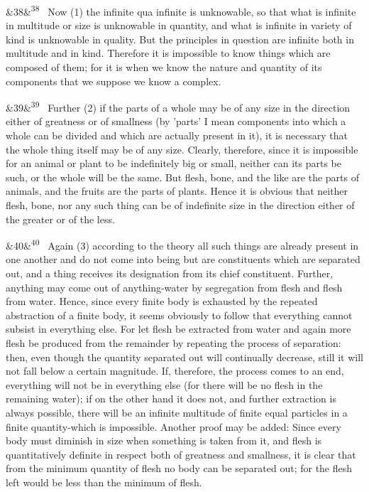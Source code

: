 \documentclass[12pt]{article}
\newcommand{\para}[1][]{\par\noindent\ifx&#1&\else\textsuperscript{\footnotesize #1}~\fi}
\begin{document}
\para[38] Now (1) the infinite qua infinite is unknowable, so that what is infinite in multitude or size is unknowable in quantity, and what is infinite in variety of kind is unknowable in quality. But the principles in question are infinite both in multitude and in kind. Therefore it is impossible to know things which are composed of them; for it is when we know the nature and quantity of its components that we suppose we know a complex.

\para[39] Further (2) if the parts of a whole may be of any size in the direction either of greatness or of smallness (by 'parts' I mean components into which a whole can be divided and which are actually present in it), it is necessary that the whole thing itself may be of any size. Clearly, therefore, since it is impossible for an animal or plant to be indefinitely big or small, neither can its parts be such, or the whole will be the same. But flesh, bone, and the like are the parts of animals, and the fruits are the parts of plants. Hence it is obvious that neither flesh, bone, nor any such thing can be of indefinite size in the direction either of the greater or of the less.

\para[40] Again (3) according to the theory all such things are already present in one another and do not come into being but are constituents which are separated out, and a thing receives its designation from its chief constituent. Further, anything may come out of anything-water by segregation from flesh and flesh from water. Hence, since every finite body is exhausted by the repeated abstraction of a finite body, it seems obviously to follow that everything cannot subsist in everything else. For let flesh be extracted from water and again more flesh be produced from the remainder by repeating the process of separation: then, even though the quantity separated out will continually decrease, still it will not fall below a certain magnitude. If, therefore, the process comes to an end, everything will not be in everything else (for there will be no flesh in the remaining water); if on the other hand it does not, and further extraction is always possible, there will be an infinite multitude of finite equal particles in a finite quantity-which is impossible. Another proof may be added: Since every body must diminish in size when something is taken from it, and flesh is quantitatively definite in respect both of greatness and smallness, it is clear that from the minimum quantity of flesh no body can be separated out; for the flesh left would be less than the minimum of flesh.
\end{document}
